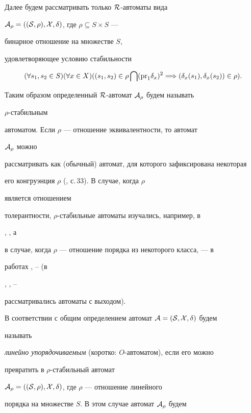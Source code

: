 Далее будем рассматривать только $\cal R$-автоматы вида


$\cal A_\rho=((S,\rho),X,\delta)$, где $\rho\subseteq S\times S$ ---


бинарное отношение на множестве $S$,


удовлетворяющее условию стабильности


$$


(\forall s_1,s_2\in S)(\forall x\in X)((s_1,s_2)\in\rho\bigcap


(\pr_1\delta_x)^2\Longrightarrow


(\delta_x(s_1),\delta_x(s_2))\in\rho).


$$





Таким образом определенный $\cal R$-автомат $\cal A_\rho$ будем называть


$\rho$-стабильным


автоматом. Если $\rho$ --- отношение эквивалентности, то автомат


$\cal A_\rho$ можно


рассматривать как (обычный) автомат, для которого зафиксирована некоторая


его конгруэнция $\rho$ (\cite{Sa1}, с.\,33). В случае, когда $\rho$


является отношением


толерантности, $\rho$-стабильные автоматы изучались, например, в


\cite{Arb}, \cite{Il}, а


в случае, когда $\rho$ --- отношение порядка из некоторого класса, --- в


работах \cite{Agi}, \cite{Kats}--\cite{Sim} (в


\cite{Agi}, \cite{Il}, \cite{Ge1}--\cite{Sim}


рассматривались автоматы с выходом).





В соответствии с общим определением автомат $\cal A=(S,X,\delta)$ будем


называть


{\em линейно упорядочиваемым} (коротко: $O$-автоматом), если его можно


превратить в $\rho$-стабильный автомат


$\cal A_\rho=((S,\rho),X,\delta)$, где $\rho$ --- отношение линейного


порядка на множестве $S$. В этом случае автомат $\cal A_\rho$ будем


